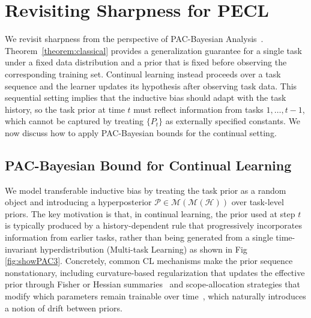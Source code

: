 \documentclass{article}
\theoremstyle{plain}
\theoremstyle{definition}
\theoremstyle{remark}
\begin{document}
\section{Revisiting Sharpness for PECL}
\label{sec:pac-pecl}

We revisit sharpness from the perspective of PAC-Bayesian Analysis~\cite{mcallesterPACBayesianModelAveraging1999}. Theorem~\ref{theorem:classical} provides a generalization guarantee for a single task under a fixed data distribution and a prior that is fixed before observing the corresponding training set. Continual learning instead proceeds over a task sequence and the learner updates its hypothesis after observing task data. This sequential setting implies that the inductive bias should adapt with the task history, so the task prior at time $t$ must reflect information from tasks $1,\dots,t-1$, which cannot be captured by treating $\{P_t\}$ as externally specified constants. We now discuss how to apply PAC-Bayesian bounds for the continual setting.

\subsection{PAC-Bayesian Bound for Continual Learning}
\label{sec:single_to_cl}

We model transferable inductive bias by treating the task prior as a random object and introducing a hyperposterior $\mathcal P\in\mathcal M(\mathcal M(\mathcal H))$ over task-level priors. The key motivation is that, in continual learning, the prior used at step $t$ is typically produced by a history-dependent rule that progressively incorporates information from earlier tasks, rather than being generated from a single time-invariant hyperdistribution (Multi-task Learning) as shown in Fig \ref{fig:showPAC3}. Concretely, common CL mechanisms make the prior sequence nonstationary, including curvature-based regularization that updates the effective prior through Fisher or Hessian summaries~\citep{EWC2017,SI2017} and scope-allocation strategies that modify which parameters remain trainable over time~\citep{progressive2016,HAT2018,Supermasks2020,pmlr-v97-houlsby19a}, which naturally introduces a notion of drift between priors.
\end{document}
